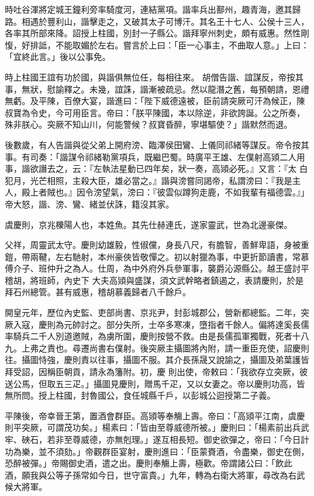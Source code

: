 \begin{pinyinscope}
 時吐谷渾將定城王鐘利旁率騎度河，連結黨項。諧率兵出鄯州，趣青海，邀其歸路。相遇於豐利山，諧擊走之，又破其太子可博汗。其名王十七人、公侯十三人，各率其所部來降。詔授上柱國，別封一子縣公。諧拜寧州刺史，頗有威惠。然性剛愎，好排詆，不能取媚於左右。嘗言於上曰：「臣一心事主，不曲取人意。」上曰：「宜終此言。」後以公事免。



 時上柱國王誼有功於國，與諧俱無位任，每相往來。
 胡僧告諧、誼謀反，帝按其事，無狀，慰諭釋之。未幾，誼誅，諧漸被疏忌。然以龍潛之舊，每預朝請，恩禮無虧。及平陳，百僚大宴，諧進曰：「陛下威德遠被，臣前請突厥可汗為候正，陳叔寶為令史，今可用臣言。帝曰：「朕平陳國，本以除逆，非欲誇誕。公之所奏，殊非朕心。突厥不知山川，何能警候？叔寶昏醉，寧堪驅使？」諧默然而退。



 後數歲，有人告諧與從父弟上開府滂、臨澤侯田鸞、上儀同祁緒等謀反。帝令按其事。有司奏：「諧謀令祁緒勒黨項兵，既繼巴蜀。時廣平王雄、左僕射高熲二人用事，諧欲譖去之，云：『左執法星動已四年矣，狀一奏，高熲必死。』又言：『太
 白犯月，光芒相照，主殺大臣，雄必當之。』諧與滂嘗同謁帝，私謂滂曰：『我是主人，殿上者賊也。』因令滂望氣，滂曰：『彼雲似蹲狗走鹿，不如我輩有福德雲。』」帝大怒，諧、滂、鸞、緒並伏誅，籍沒其家。



 虞慶則，京兆櫟陽人也，本姓魚。其先仕赫連氏，遂家靈武，世為北邊豪傑。



 父祥，周靈武太守。慶則幼雄毅，性俶儻，身長八尺，有膽智，善鮮卑語，身被重鎧，帶兩鞬，左右馳射，本州豪俠皆敬憚之。初以射獵為事，中更折節讀書，常慕傅介子、班仲升之為人。仕周，為中外府外兵參軍事，襲爵沁源縣公。越王盛討平稽胡，將班師，內史下
 大夫高熲與盛謀，須文武幹略者鎮遏之，表請慶則，於是拜石州總管。甚有威惠，稽胡慕義歸者八千餘戶。



 開皇元年，歷位內史監、吏部尚書、京兆尹，封彭城郡公，營新都總監。二年，突厥入寇，慶則為元帥討之。部分失所，士卒多寒凍，墮指者千餘人。偏將達奚長儒率騎兵二千人別道邀賊，為虜所圍，慶則按營不救。由是長儒孤軍獨戰，死者十八九。上弗之責也。尋遷尚書右僕射。後突厥主攝圖將內附，請一重臣充使，詔慶則往。攝圖恃強，慶則責以往事，攝圖不服。其介長孫晟又說諭之，攝圖及弟葉護皆拜受詔，因稱臣朝貢，請永為籓附。初，慶
 則出使，帝敕曰：「我欲存立突厥，彼送公馬，但取五三疋。」攝圖見慶則，贈馬千疋，又以女妻之。帝以慶則功高，皆無所問。授上柱國，封魯國公，食任城縣千戶，以彭城公迴授第二子義。



 平陳後，帝幸晉王第，置酒會群臣。高熲等奉觴上壽。帝曰：「高熲平江南，虞慶則平突厥，可謂茂功矣。」楊素曰：「皆由至尊威德所被。」慶則曰：「楊素前出兵武牢、硤石，若非至尊威德，亦無剋理。」遂互相長短。御史欲彈之，帝曰：「今日計功為樂，並不須劾。」帝觀群臣宴射，慶則進曰：「臣蒙賚酒，令盡樂，御史在側，恐醉被彈。」帝賜御史酒，遣之出。慶則奉觴上壽，極歡。帝謂諸公曰：「飲此
 酒，願我與公等子孫常如今日，世守富貴。」九年，轉為右衛大將軍，尋改為右武候大將軍。




\end{pinyinscope}
